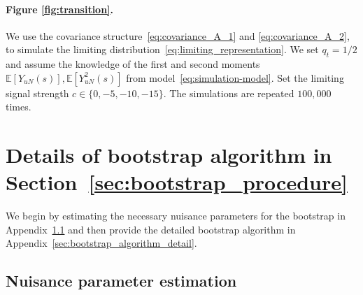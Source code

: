 \documentclass[12pt]{article}
\newcommand{\E}{\mathbb E}								%
\begin{document}
\paragraph{Figure \ref{fig:transition}.}

We use the covariance structure~\eqref{eq:covariance_A_1} and \eqref{eq:covariance_A_2}, to simulate the limiting distribution~\eqref{eq:limiting_representation}. We set $q_t=1/2$ and assume the knowledge of the first and second moments $\E[Y_{uN}(s)],\E[Y_{uN}^2(s)]$ from model~\eqref{eq:simulation-model}. Set the limiting signal strength $c\in \{0,-5,-10,-15\}$. The simulations are repeated $100,000$ times.


\section{Details of bootstrap algorithm in Section~\ref{sec:bootstrap_procedure}}\label{sec:bootstrap_algorithm}


We begin by estimating the necessary nuisance parameters for the bootstrap in Appendix~\ref{sec:bootstrap_nuisance} and then provide the detailed bootstrap algorithm in Appendix~\ref{sec:bootstrap_algorithm_detail}.

\subsection{Nuisance parameter estimation}\label{sec:bootstrap_nuisance}
\end{document}
